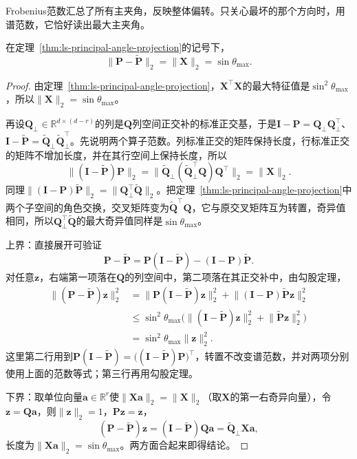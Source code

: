 Frobenius范数汇总了所有主夹角，反映整体偏转。只关心最坏的那个方向时，用谱范数，它恰好读出最大主夹角。
\begin{theorem}[投影之差的谱范数]
\label{thm:ls-projection-spectral-distance}
在定理~\ref{thm:ls-principal-angle-projection}的记号下，
\begin{equation}
 \lVert\bm P-\widetilde{\bm P}\rVert_2=\lVert\bm X\rVert_2=\sin\theta_{\max}.
 \label{eq:ls-projection-spectral-distance}
\end{equation}
\end{theorem}
\begin{proof}
由定理~\ref{thm:ls-principal-angle-projection}，$\bm X^\top\bm X$的最大特征值是$\sin^2\theta_{\max}$，所以$\lVert\bm X\rVert_2=\sin\theta_{\max}$。

再设$\bm Q_\perp\in\mathbb R^{d\times(d-r)}$的列是$\bm Q$列空间正交补的标准正交基，于是$\bm I-\bm P=\bm Q_\perp\bm Q_\perp^\top$、$\bm I-\widetilde{\bm P}=\widetilde{\bm Q}_\perp\widetilde{\bm Q}_\perp^\top$。先说明两个算子范数。列标准正交的矩阵保持长度，行标准正交的矩阵不增加长度，并在其行空间上保持长度，所以
\[
 \lVert(\bm I-\widetilde{\bm P})\bm P\rVert_2
 =\lVert\widetilde{\bm Q}_\perp(\widetilde{\bm Q}_\perp^\top\bm Q)\bm Q^\top\rVert_2
 =\lVert\bm X\rVert_2 .
\]
同理$\lVert(\bm I-\bm P)\widetilde{\bm P}\rVert_2=\lVert\bm Q_\perp^\top\widetilde{\bm Q}\rVert_2$。把定理~\ref{thm:ls-principal-angle-projection}中两个子空间的角色交换，交叉矩阵变为$\widetilde{\bm Q}^\top\bm Q$，它与原交叉矩阵互为转置，奇异值相同，所以$\bm Q_\perp^\top\widetilde{\bm Q}$的最大奇异值同样是$\sin\theta_{\max}$。

上界：直接展开可验证
\[
 \bm P-\widetilde{\bm P}=\bm P(\bm I-\widetilde{\bm P})-(\bm I-\bm P)\widetilde{\bm P}.
\]
对任意$\bm z$，右端第一项落在$\bm Q$的列空间中，第二项落在其正交补中，由勾股定理，
\[
 \begin{aligned}
 \lVert(\bm P-\widetilde{\bm P})\bm z\rVert_2^2
 &=\lVert\bm P(\bm I-\widetilde{\bm P})\bm z\rVert_2^2+\lVert(\bm I-\bm P)\widetilde{\bm P}\bm z\rVert_2^2\\
 &\leq\sin^2\theta_{\max}\bigl(\lVert(\bm I-\widetilde{\bm P})\bm z\rVert_2^2+\lVert\widetilde{\bm P}\bm z\rVert_2^2\bigr)\\
 &=\sin^2\theta_{\max}\lVert\bm z\rVert_2^2 .
 \end{aligned}
\]
这里第二行用到$\bm P(\bm I-\widetilde{\bm P})=\bigl((\bm I-\widetilde{\bm P})\bm P\bigr)^\top$，转置不改变谱范数，并对两项分别使用上面的范数等式；第三行再用勾股定理。

下界：取单位向量$\bm a\in\mathbb R^r$使$\lVert\bm X\bm a\rVert_2=\lVert\bm X\rVert_2$（取$\bm X$的第一右奇异向量），令$\bm z=\bm Q\bm a$，则$\lVert\bm z\rVert_2=1$，$\bm P\bm z=\bm z$，
\[
 (\bm P-\widetilde{\bm P})\bm z=(\bm I-\widetilde{\bm P})\bm Q\bm a=\widetilde{\bm Q}_\perp\bm X\bm a ,
\]
长度为$\lVert\bm X\bm a\rVert_2=\sin\theta_{\max}$。两方面合起来即得结论。
\end{proof}

